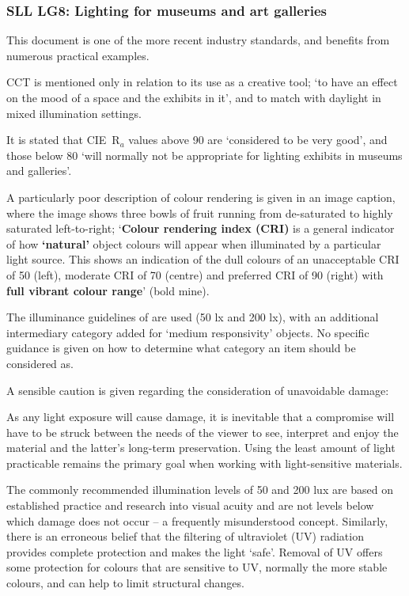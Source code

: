 \subsubsection{SLL LG8: Lighting for museums and art galleries}

This document \citep{cibse_lighting_2015} is one of the more recent industry standards, and benefits from numerous practical examples. 

\gls{CCT} is mentioned only in relation to its use as a creative tool; `to have an effect on the mood of a space and the exhibits in it', and to match with daylight in mixed illumination settings.

It is stated that \gls{CIE}~R$_a$ values above 90 are `considered to be very good', and those below 80 `will normally not be appropriate for lighting exhibits in
museums and galleries'.

A particularly poor description of colour rendering is given in an image caption, where the image shows three bowls of fruit running from de-saturated to highly saturated left-to-right; `\textbf{Colour rendering index (CRI)} is a general indicator of how \textbf{`natural'} object colours will appear when illuminated by a particular light source. This shows an indication of the dull colours of an unacceptable CRI of 50 (left), moderate CRI of 70 (centre) and preferred CRI of 90 (right) with \textbf{full vibrant colour range}' (bold mine).

The illuminance guidelines of \citet{thomson_museum_1986} are used (50 lx and 200 lx), with an additional intermediary category added for `medium responsivity' objects. No specific guidance is given on how to determine what category an item should be considered as.

A sensible caution is given regarding the consideration of unavoidable damage: 

\begin{itquote}{}
As any light exposure will cause damage, it is inevitable that a compromise will
have to be struck between the needs of the viewer to see, interpret and enjoy
the material and the latter’s long-term preservation. Using the least amount of
light practicable remains the primary goal when working with light-sensitive
materials.
\end{itquote}

\begin{itquote}{}
The commonly recommended illumination levels of 50 and 200 lux are based on established practice and research into visual acuity and are not levels below which damage does not occur – a frequently misunderstood concept. Similarly, there is an erroneous belief that the filtering of ultraviolet (UV) radiation provides complete protection and makes the light ‘safe’. Removal of UV offers some protection for colours that are sensitive to UV, normally the more stable colours, and can help to limit structural changes.
\end{itquote}

